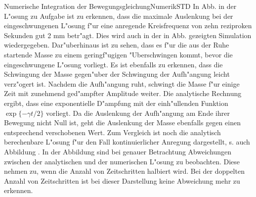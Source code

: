 \begin{MXContent}{Numerische Integration der Bewegungsgleichung}{Numerik}{STD}
In Abb.  in der L"osung zu Aufgabe  ist zu erkennen, dass die maximale Auslenkung bei der eingeschwungenen L"osung f"ur eine anregende Kreisfrequenz von zehn reziproken Sekunden gut 2 mm betr"agt. Dies wird auch in der in Abb.  gezeigten Simulation wiedergegeben. Dar"uberhinaus ist zu sehen, dass es f"ur die aus der Ruhe startende Masse zu einem geringf"ugigen "Uberschwingen kommt, bevor die eingeschwungene L"osung vorliegt. Es ist ebenfalls zu erkennen, dass die Schwingung der Masse gegen"uber der Schwingung der Aufh"angung leicht verz"ogert ist. Nachdem die Aufh"angung ruht, schwingt die Masse f"ur einige Zeit mit zunehmend ged"ampfter Amplitude weiter. Die analytische Rechnung ergibt, dass eine exponentielle D"ampfung mit der einh"ullenden Funktion $\exp\{-\gamma t /2\}$ vorliegt. Da die Auslenkung der Aufh"angung am Ende ihrer Bewegung nicht Null ist, geht die Auslenkung der Masse ebenfalls gegen einen entsprechend verschobenen Wert. Zum Vergleich ist noch die analytisch berechenbare L"osung f"ur den Fall kontinuierlicher Anregung dargestellt, s. auch Abbildung . In der Abbildung sind bei genauer Betrachtung Abweichungen zwischen der analytischen und der numerischen L"osung zu beobachten. Diese nehmen zu, wenn die Anzahl von Zeitschritten halbiert wird. Bei der doppelten Anzahl von Zeitschritten ist bei dieser Darstellung keine Abweichung mehr zu erkennen.

\end{MXContent}


